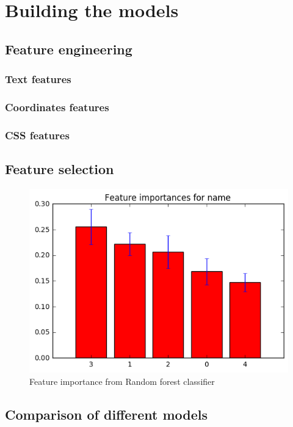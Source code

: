\chapter{Building the models}
\label{chap:model}
\section{Feature engineering}
\subsection{Text features}
\subsection{Coordinates features}
\subsection{CSS features}
\section{Feature selection}

\begin{figure}[h]
\begin{center}
\includegraphics[width=14cm]{figures06/feature_importance_names}
\caption{Feature importance from Random forest classifier}
\label{fig:feature_importance}
\end{center}
\end{figure}


\section{Comparison of different models}